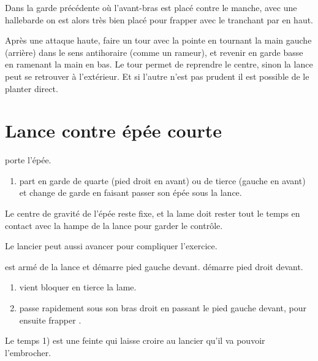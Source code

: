 Dans la garde précédente où l'avant-bras est placé contre le manche, avec une hallebarde on est alors très bien placé pour frapper avec le tranchant par en haut.

\begin{technique}
Après une attaque haute, faire un tour avec la pointe en tournant la main gauche (arrière) dans le sens antihoraire (comme un rameur), et revenir en garde basse en ramenant la main en bas.
Le tour permet de reprendre le centre, sinon la lance peut se retrouver à l'extérieur.
Et si l'autre n'est pas prudent il est possible de le planter direct.
\end{technique}


\section{Lance contre épée courte}


\begin{exercice}

\A porte l'épée.

\begin{enumerate}
	\item \A part en garde de quarte (pied droit en avant) ou de tierce (gauche en avant) et change de garde en faisant passer son épée sous la lance.
\end{enumerate}

Le centre de gravité de l'épée reste fixe, et la lame doit rester tout le temps en contact avec la hampe de la lance pour garder le contrôle.

Le lancier peut aussi avancer pour compliquer l'exercice.
\end{exercice}


\begin{technique}

\D est armé de la lance et démarre pied gauche devant.
\A démarre pied droit devant.

\begin{enumerate}
	\item \A vient bloquer en tierce la lame.
	
	\item \A passe rapidement sous son bras droit en passant le pied gauche devant, pour ensuite frapper \D.
\end{enumerate}

Le temps 1) est une feinte qui laisse croire au lancier qu'il va pouvoir l'embrocher.
\end{technique}


